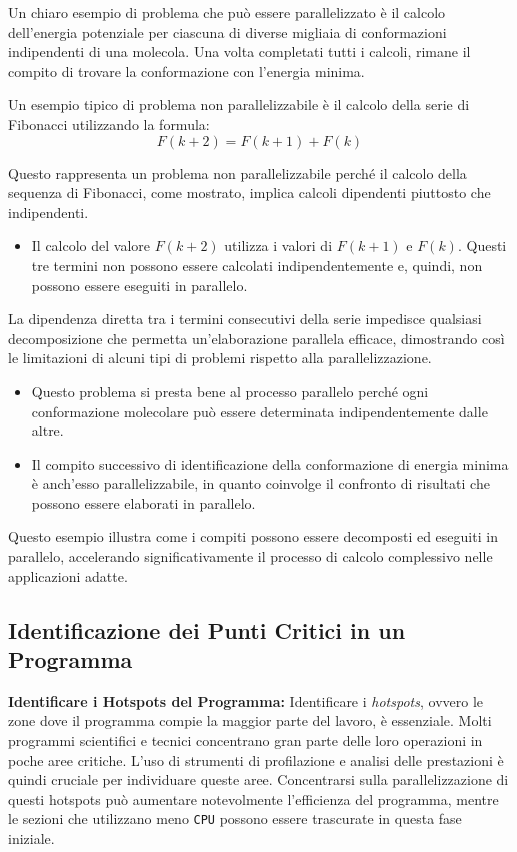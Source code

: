 Un chiaro esempio di problema che può essere
parallelizzato è il calcolo dell'energia potenziale per
ciascuna di diverse migliaia di conformazioni indipendenti
di una molecola. Una volta completati tutti i calcoli,
rimane il compito di trovare la conformazione con l'energia
minima.

Un esempio tipico di problema non parallelizzabile è
il calcolo della serie di Fibonacci
utilizzando la formula:
\[ F(k + 2) = F(k + 1) + F(k) \]

Questo rappresenta un problema non parallelizzabile
perché il calcolo della sequenza di Fibonacci, come
mostrato, implica calcoli dipendenti piuttosto che
indipendenti.

\begin{itemize}
    \item Il calcolo del valore \( F(k + 2) \)
    utilizza i valori di \( F(k + 1) \) e \( F(k) \).
    Questi tre termini non possono essere calcolati
    indipendentemente e, quindi, non possono essere
    eseguiti in parallelo.
\end{itemize}

La dipendenza diretta tra i termini consecutivi della
serie impedisce qualsiasi decomposizione che permetta
un'elaborazione parallela efficace, dimostrando così
le limitazioni di alcuni tipi di problemi rispetto alla
parallelizzazione.


\begin{itemize}
    \item Questo problema si presta bene al processo parallelo perché ogni conformazione molecolare può essere determinata indipendentemente dalle altre.
    \item Il compito successivo di identificazione della conformazione di energia minima è anch'esso parallelizzabile, in quanto coinvolge il confronto di risultati che possono essere elaborati in parallelo.
\end{itemize}

Questo esempio illustra come i compiti possono essere decomposti ed eseguiti in parallelo, accelerando significativamente il processo di calcolo complessivo nelle applicazioni adatte.

\subsection{Identificazione dei Punti Critici in un Programma}

\textbf{Identificare i Hotspots del Programma:}
Identificare i \textit{hotspots}, ovvero le zone dove il programma
compie la maggior parte del lavoro, è essenziale. Molti
programmi scientifici e tecnici concentrano gran
parte delle loro operazioni in poche aree critiche.
L'uso di strumenti di profilazione e analisi delle
prestazioni è quindi cruciale per individuare queste aree.
Concentrarsi sulla parallelizzazione di questi hotspots
può aumentare notevolmente l'efficienza del programma,
mentre le sezioni che utilizzano meno \texttt{CPU}
possono essere
trascurate in questa fase iniziale.

